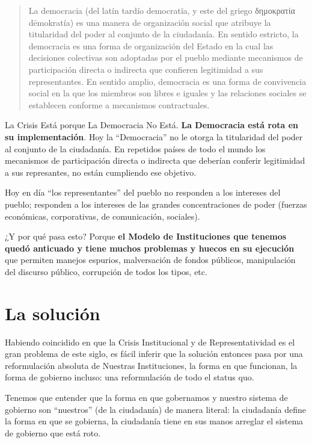 \documentclass[
]{book}
\begin{document}
\begin{quote}
La democracia (del latín tardío democratĭa, y este del griego δημοκρατία dēmokratía) es una manera de organización social que atribuye la titularidad del poder al conjunto de la ciudadanía. En sentido estricto, la democracia es una forma de organización del Estado en la cual las decisiones colectivas son adoptadas por el pueblo mediante mecanismos de participación directa o indirecta que confieren legitimidad a sus representantes. En sentido amplio, democracia es una forma de convivencia social en la que los miembros son libres e iguales y las relaciones sociales se establecen conforme a mecanismos contractuales.
\end{quote}

La Crisis Está porque La Democracia No Está. \textbf{La Democracia está rota en su implementación}. Hoy la ``Democracia'' no le otorga la titularidad del poder al conjunto de la ciudadanía. En repetidos países de todo el mundo los mecanismos de participación directa o indirecta que deberían conferir legitimidad a sus represantes, no están cumpliendo ese objetivo.

Hoy en día ``los representantes'' del pueblo no responden a los intereses del pueblo; responden a los intereses de las grandes concentraciones de poder (fuerzas económicas, corporativas, de comunicación, sociales).

¿Y por qué pasa esto? Porque \textbf{el Modelo de Instituciones que tenemos quedó anticuado y tiene muchos problemas y huecos en su ejecución} que permiten manejos espurios, malversación de fondos públicos, manipulación del discurso público, corrupción de todos los tipos, etc.

\hypertarget{la-soluciuxf3n}{%
\section{La solución}\label{la-soluciuxf3n}}

Habiendo coincidido en que la Crisis Institucional y de Representatividad es el gran problema de este siglo, es fácil inferir que la solución entonces pasa por una reformulación absoluta de Nuestras Instituciones, la forma en que funcionan, la forma de gobierno incluso: una reformulación de todo el status quo.

Tenemos que entender que la forma en que gobernamos y nuestro sistema de gobierno son ``nuestros'' (de la ciudadanía) de manera literal: la ciudadanía define la forma en que se gobierna, la ciudadanía tiene en sus manos arreglar el sistema de gobierno que está roto.
\end{document}
